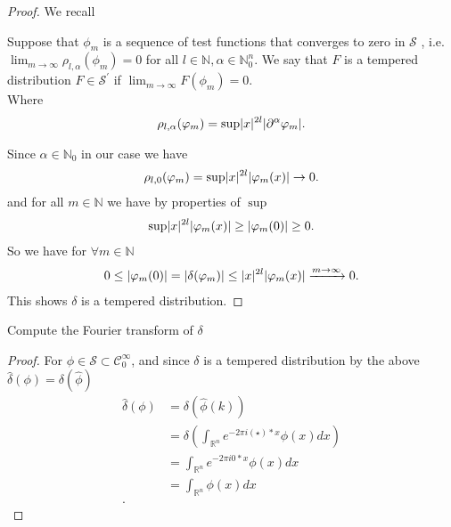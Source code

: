 \begin{proof}
 We recall \\
 \begin{Definition}[Tempered]
   Suppose that $\phi_m$ is a sequence of test functions that converges to zero in $\mathcal{S}$ , i.e. $\lim_{m\to \infty} \rho_{l,\alpha }(\phi_m) = 0$  for all $l \in  \mathbb{N}, \alpha \in \mathbb{N}_0^{n}  $. We say
that $F$ is a tempered distribution $F \in  \mathcal{S}^{'} $ if $\lim_{m\to \infty} F(\phi_m) = 0$.\\
Where 
\begin{align*}
  \rho_{l,\alpha }(\varphi_m) = \sup \lvert x\rvert^{2l}\lvert\partial^\alpha \varphi_m\rvert  
.\end{align*}
 \end{Definition}
 Since $\alpha \in \mathbb{N}_0$ in our case we have 
 \begin{align*}
   \rho_{l,0}(\varphi_m) = \sup \lvert x\rvert^{2l}\lvert\varphi_m(x)\rvert  \to 0
 .\end{align*}
 and for all $m \in  \mathbb{N}$ we have by properties of $\sup$
 \begin{align*}
  \sup \lvert x\rvert^{2l}\lvert\varphi_m(x)\rvert \ge \lvert\varphi_m(0)\rvert \ge 0
 .\end{align*}
 So we have for $\forall  m \in  \mathbb{N}$ 
 \begin{align*}
   0\le \lvert\varphi_m(0)\rvert = \lvert\delta(\varphi_m)\rvert \le \lvert x\rvert^{2l}\lvert\varphi_m(x)\rvert \xrightarrow{m \to \infty} 0
 .\end{align*}
This shows $\delta $ is a tempered distribution.
\end{proof}
\begin{exercise}[f]
  Compute the Fourier transform of $\delta $
  \end{exercise}
  \begin{proof}
    For $\phi  \in  \mathcal{S} \subset  \mathcal{C}_0^{\infty} $, and since $\delta $ is a tempered distribution by the above $\hat{\delta }(\phi ) = \delta(\hat{\phi } )$
 \begin{align*}
   \hat{\delta}(\phi ) &= \delta(\hat{\phi}(k) )\\
                       &= \delta \left(\int_{\mathbb{R}^{n} } e^{-2\pi i (\star) *x} \phi (x) dx \right)\\
                       &= \int_{\mathbb{R}^{n} } e^{-2\pi i0 *x} \phi (x) dx \\
                       &=  \int_{\mathbb{R}^{n} }  \phi (x) dx \\
 .\end{align*}
  \end{proof}
